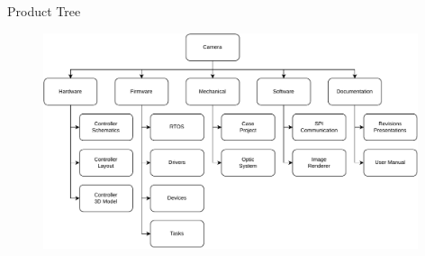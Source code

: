 \begin{frame}{Product Tree}

    \begin{figure}[!ht]
        \begin{center}
            \includegraphics[width=11cm]{figures/product-tree-cam}
        \end{center}
    \end{figure}

\end{frame}



